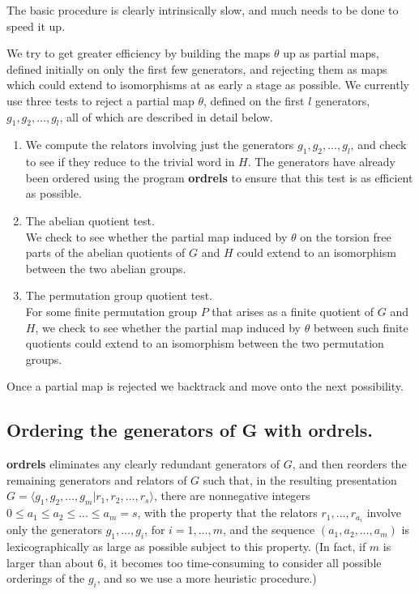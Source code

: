 The basic procedure is clearly intrinsically slow, and much needs to be done
to speed it up.

We try to get greater efficiency by building the maps $\theta$ up as partial
maps, defined initially on only the first few generators, and rejecting them
as maps which could extend to isomorphisms at as early a stage as possible.
We currently use three tests to reject  a partial map $\theta$, defined on
the first $l$ generators, $g_1, g_2, \ldots ,g_l $, all of which are
described in detail below.
\begin{enumerate}
\item
We compute the relators involving just the generators $g_1, g_2, \ldots
,g_l$, and check to see if they reduce to the trivial word in $H$. 
The generators have already been ordered using the program {\bf ordrels}
to ensure that this test is as efficient as possible.
\item
The abelian quotient test.\\
We check to see whether the partial map induced by $\theta$ on the torsion free
parts of the  abelian
quotients of $G$ and $H$ could extend to an isomorphism between the two
abelian groups.
\item
The permutation group quotient test.\\
For some finite permutation group $P$  that arises as a finite quotient of
$G$ and $H$, we check to see whether the partial map induced by $\theta$
between such finite quotients could extend to an isomorphism between the
two permutation groups.
\end{enumerate}
Once a partial map is rejected we backtrack and move onto the next
possibility. 

\subsection{Ordering the generators of G with ordrels.}
{\bf ordrels} eliminates any clearly redundant generators of $G$, and then
reorders the remaining generators and relators of $G$ such that, in the
resulting presentation
$G = \langle g_1, g_2, \ldots , g_m | r_1, r_2, \ldots , r_s \rangle$,
there are nonnegative integers $0 \leq a_1 \leq a_2 \leq ... \leq a_m = s$,
with the property that the relators $r_1, \ldots , r_{a_i}$  involve only the
generators $g_1, \ldots , g_i$,  for $i = 1,\ldots ,m$,  and the sequence
$(a_1,a_2,\ldots ,a_m)$ is lexicographically as large as possible subject to
this property. (In fact, if $m$ is larger than about 6, it becomes too
time-consuming to consider all possible orderings of the $g_i$, and so we use
a more heuristic procedure.)

